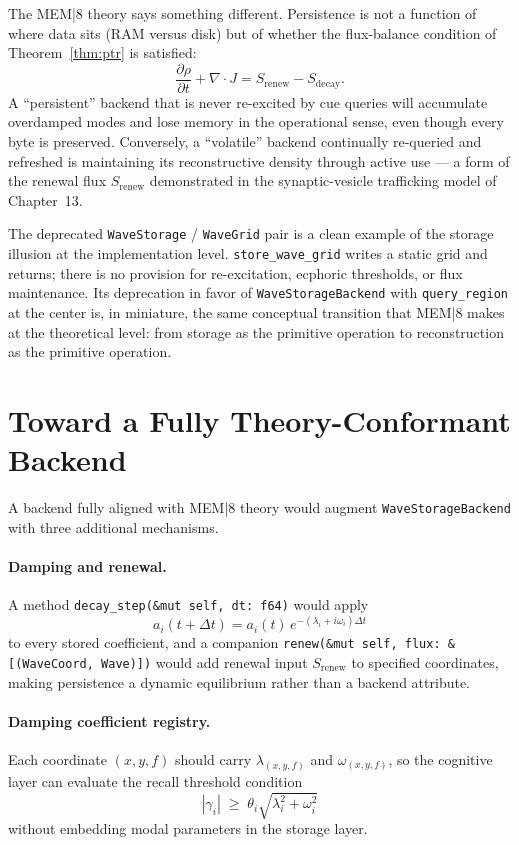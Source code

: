 \documentclass[12pt, oneside]{book}
\theoremstyle{plain}
\theoremstyle{definition}
\theoremstyle{remark}
\begin{document}
The MEM|8 theory says something different.
Persistence is not a function of where data sits
(RAM versus disk) but of whether the flux-balance condition
of Theorem~\ref{thm:ptr} is satisfied:
\[
  \frac{\partial \rho}{\partial t} + \nabla \cdot J
  = S_{\mathrm{renew}} - S_{\mathrm{decay}}.
\]
A ``persistent'' backend that is never re-excited by cue
queries will accumulate overdamped modes and lose memory in
the operational sense, even though every byte is preserved.
Conversely, a ``volatile'' backend continually re-queried and
refreshed is maintaining its reconstructive density through
active use --- a form of the renewal flux $S_{\mathrm{renew}}$
demonstrated in the synaptic-vesicle trafficking model of
Chapter~13.

The deprecated \texttt{WaveStorage} / \texttt{WaveGrid} pair
is a clean example of the storage illusion at the
implementation level.
\texttt{store\_wave\_grid} writes a static grid and returns;
there is no provision for re-excitation, ecphoric thresholds,
or flux maintenance.
Its deprecation in favor of \texttt{WaveStorageBackend} with
\texttt{query\_region} at the center is, in miniature, the same
conceptual transition that MEM|8 makes at the theoretical level:
from storage as the primitive operation to reconstruction as
the primitive operation.

\section{Toward a Fully Theory-Conformant Backend}

A backend fully aligned with MEM|8 theory would augment
\texttt{WaveStorageBackend} with three additional mechanisms.

\paragraph{Damping and renewal.}
A method \texttt{decay\_step(\&mut self, dt: f64)} would apply
\[
  a_i(t+\Delta t) = a_i(t)\,e^{-(\lambda_i + i\omega_i)\Delta t}
\]
to every stored coefficient, and a companion
\texttt{renew(\&mut self, flux: \&[(WaveCoord, Wave)])} would
add renewal input $S_{\mathrm{renew}}$ to specified coordinates,
making persistence a dynamic equilibrium rather than a backend
attribute.

\paragraph{Damping coefficient registry.}
Each coordinate $(x, y, f)$ should carry $\lambda_{(x,y,f)}$
and $\omega_{(x,y,f)}$, so the cognitive layer can evaluate
the recall threshold condition
\[
  |\gamma_i| \;\geq\; \theta_i\sqrt{\lambda_i^2 + \omega_i^2}
\]
without embedding modal parameters in the storage layer.
\end{document}
